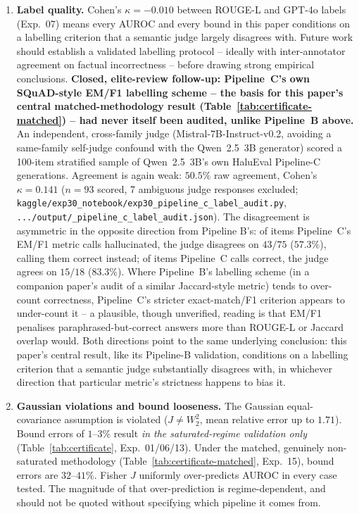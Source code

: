 \documentclass[onecolumn]{jmlr}
\begin{document}
\begin{enumerate}[leftmargin=*, topsep=2pt, itemsep=2pt]

\item \textbf{Label quality.} Cohen's $\kappa = -0.010$ between
  ROUGE-L and GPT-4o labels (Exp.~07) means every AUROC and every bound
  in this paper conditions on a labelling criterion that a semantic
  judge largely disagrees with. Future work should establish a
  validated labelling protocol -- ideally with inter-annotator agreement
  on factual incorrectness -- before drawing strong empirical
  conclusions. \textbf{Closed, elite-review follow-up: Pipeline~C's own
  SQuAD-style EM/F1 labelling scheme -- the basis for this paper's
  central matched-methodology result (Table~\ref{tab:certificate-matched})
  -- had never itself been audited, unlike Pipeline~B above.} An
  independent, cross-family judge (Mistral-7B-Instruct-v0.2, avoiding a
  same-family self-judge confound with the Qwen~2.5~3B generator) scored
  a 100-item stratified sample of Qwen~2.5~3B's own HaluEval Pipeline-C
  generations. Agreement is again weak: $50.5\%$ raw agreement, Cohen's
  $\kappa = 0.141$ ($n=93$ scored, 7 ambiguous judge responses excluded;
  \texttt{kaggle/\allowbreak exp30\_\allowbreak notebook/\allowbreak exp30\_\allowbreak pipeline\_\allowbreak c\_\allowbreak label\_\allowbreak audit.py},
  \texttt{.../\allowbreak output/\_\allowbreak pipeline\_\allowbreak c\_\allowbreak label\_\allowbreak audit.json}).
  The disagreement is asymmetric in the opposite direction from Pipeline
  B's: of items Pipeline~C's EM/F1 metric calls hallucinated, the judge
  disagrees on $43/75$ ($57.3\%$), calling them correct instead; of
  items Pipeline~C calls correct, the judge agrees on $15/18$
  ($83.3\%$). Where Pipeline~B's labelling scheme (in a companion
  paper's audit of a similar Jaccard-style metric) tends to
  over-count correctness, Pipeline~C's stricter exact-match/F1
  criterion appears to under-count it -- a plausible, though unverified,
  reading is that EM/F1 penalises paraphrased-but-correct answers more
  than ROUGE-L or Jaccard overlap would. Both directions point to the
  same underlying conclusion: this paper's central result, like its
  Pipeline-B validation, conditions on a labelling criterion that a
  semantic judge substantially disagrees with, in whichever direction
  that particular metric's strictness happens to bias it.

\item \textbf{Gaussian violations and bound looseness.} The Gaussian
  equal-covariance assumption is violated ($J \neq W_2^2$, mean relative
  error up to $1.71$). Bound errors of $1$--$3\%$ result \emph{in the
  saturated-regime validation only} (Table~\ref{tab:certificate},
  Exp.~01/06/13). Under the matched, genuinely non-saturated methodology
  (Table~\ref{tab:certificate-matched}, Exp.~15), bound errors are
  $32$--$41\%$. Fisher $J$ uniformly over-predicts AUROC in every case
  tested. The magnitude of that over-prediction is regime-dependent, and
  should not be quoted without specifying which pipeline it comes from.


\end{enumerate}
\end{document}
